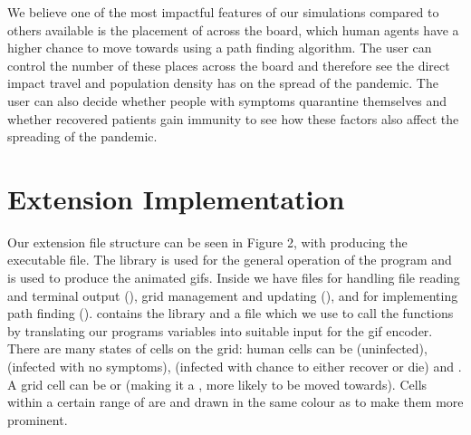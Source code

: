 \documentclass[11pt]{article}
\begin{document}
\par We believe one of the most impactful features of our simulations compared to others available is the placement of  across the board, which human agents have a higher chance to move towards using a path finding algorithm. 
The user can control the number of these places across the board and therefore see the direct impact travel and population density has on the spread of the pandemic. 
The user can also decide whether people with symptoms quarantine themselves and whether recovered patients gain immunity to see how these factors also affect the spreading of the pandemic.

\section{Extension Implementation}
 Our extension file structure can be seen in Figure 2, with  producing the executable file. 
 The  library is used for the general operation of the program and  is used to produce the animated gifs. 
 Inside  we have files for handling file reading and terminal output (), grid management and updating (), and for implementing path finding ().
  contains the  library \cite{gifenc} and a  file which we use to call the  functions by translating our programs variables into suitable input for the gif encoder. 
 There are many states of cells on the grid: human cells can be  (uninfected),  (infected with no symptoms),  (infected with chance to either recover or die) and . 
 A grid cell can be  or  (making it a , more likely to be moved towards). Cells within a certain range of  are  and drawn in the same colour as  to make them more prominent.
 
\end{document}
